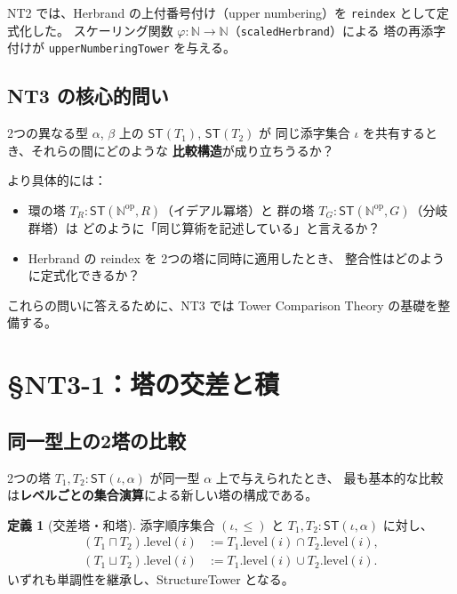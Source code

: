 \documentclass[a4paper,11pt]{ltjsarticle}
\theoremstyle{definition}
\newtheorem{definition}{定義}[section]
\theoremstyle{plain}
\theoremstyle{remark}
\newcommand{\ST}{\mathsf{ST}}
\newcommand{\towerMeet}{\sqcap}
\newcommand{\towerJoin}{\sqcup}
\newcommand{\OD}{\mathbb{N}^{\mathrm{op}}}
\begin{document}
NT2 では、Herbrand の上付番号付け（upper numbering）を \texttt{reindex} として定式化した。
スケーリング関数 \(\varphi : \mathbb{N} \to \mathbb{N}\)（\texttt{scaledHerbrand}）による
塔の再添字付けが \texttt{upperNumberingTower} を与える。

\subsection{NT3 の核心的問い}

\begin{mathinsight}
2つの異なる型 $\alpha$, $\beta$ 上の $\ST(T_1)$, $\ST(T_2)$ が
同じ添字集合 $\iota$ を共有するとき、それらの間にどのような
\textbf{比較構造}が成り立ちうるか？
\end{mathinsight}

より具体的には：
\begin{itemize}
  \item 環の塔 \(T_R : \ST(\OD, R)\)（イデアル冪塔）と
        群の塔 \(T_G : \ST(\OD, G)\)（分岐群塔）は
        どのように「同じ算術を記述している」と言えるか？
  \item Herbrand の reindex を 2つの塔に同時に適用したとき、
        整合性はどのように定式化できるか？
\end{itemize}

これらの問いに答えるために、NT3 では Tower Comparison Theory の基礎を整備する。

\section{\S NT3-1：塔の交差と積}

\subsection{同一型上の2塔の比較}

2つの塔 $T_1, T_2 : \ST(\iota, \alpha)$ が同一型 $\alpha$ 上で与えられたとき、
最も基本的な比較は\textbf{レベルごとの集合演算}による新しい塔の構成である。

\begin{definition}[交差塔・和塔]
添字順序集合 $(\iota, \leq)$ と $T_1, T_2 : \ST(\iota, \alpha)$ に対し、
\begin{align}
  (T_1 \towerMeet T_2).\mathrm{level}(i) &:= T_1.\mathrm{level}(i) \cap T_2.\mathrm{level}(i), \\
  (T_1 \towerJoin T_2).\mathrm{level}(i) &:= T_1.\mathrm{level}(i) \cup T_2.\mathrm{level}(i).
\end{align}
いずれも単調性を継承し、StructureTower となる。
\end{definition}
\end{document}
